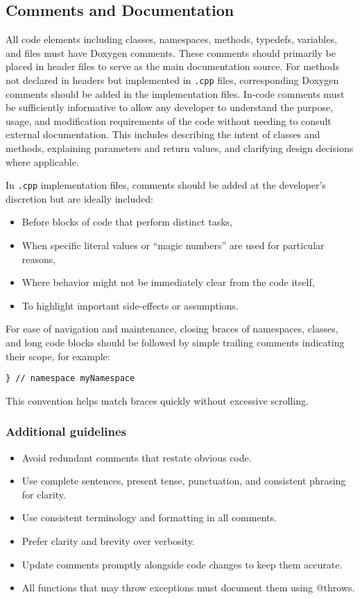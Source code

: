 \subsection{Comments and Documentation}

All code elements including classes, namespaces, methods, typedefs, variables, and files must have Doxygen comments. These comments should primarily be placed in header files to serve as the main documentation source. For methods not declared in headers but implemented in \texttt{.cpp} files, corresponding Doxygen comments should be added in the implementation files. In-code comments must be sufficiently informative to allow any developer to understand the purpose, usage, and modification requirements of the code without needing to consult external documentation. This includes describing the intent of classes and methods, explaining parameters and return values, and clarifying design decisions where applicable.

In \texttt{.cpp} implementation files, comments should be added at the developer’s discretion but are ideally included:
\begin{itemize}\itemsep0em
    \item Before blocks of code that perform distinct tasks,
    \item When specific literal values or “magic numbers” are used for particular reasons,
    \item Where behavior might not be immediately clear from the code itself,
    \item To highlight important side-effects or assumptions.
\end{itemize}
For ease of navigation and maintenance, closing braces of namespaces, classes, and long code blocks should be followed by simple trailing comments indicating their scope, for example:
\begin{lstlisting}[style=cppstyle]
} // namespace myNamespace
\end{lstlisting}
This convention helps match braces quickly without excessive scrolling.

\subsubsection*{Additional guidelines}
\begin{itemize}\itemsep0em
    \item Avoid redundant comments that restate obvious code.
    \item Use complete sentences, present tense, punctuation, and consistent phrasing for clarity.
    \item Use consistent terminology and formatting in all comments.
    \item Prefer clarity and brevity over verbosity.
    \item Update comments promptly alongside code changes to keep them accurate.
    \item All functions that may throw exceptions must document them using @throws. 
\end{itemize}

